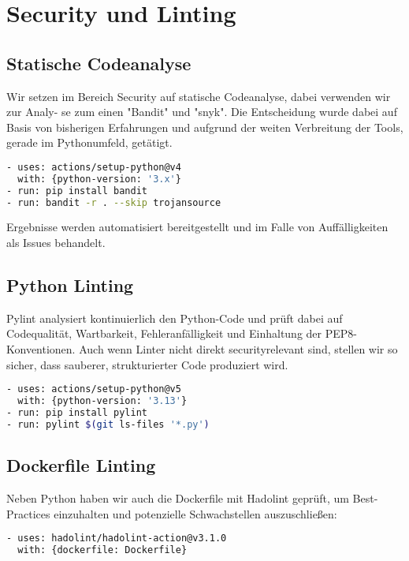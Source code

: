 \documentclass[12pt, a4paper]{scrreprt}
\begin{document}
\chapter{Security und Linting}

\section{Statische Codeanalyse}
Wir setzen im Bereich Security auf statische Codeanalyse, dabei verwenden wir zur Analy- se zum einen "Bandit" und "snyk". Die Entscheidung wurde dabei auf Basis von bisherigen Erfahrungen und aufgrund der weiten Verbreitung der Tools, gerade im Pythonumfeld, getätigt.

\begin{lstlisting}[language=Bash, caption=Bandit via GitHub Actions]
- uses: actions/setup-python@v4
  with: {python-version: '3.x'}
- run: pip install bandit
- run: bandit -r . --skip trojansource
\end{lstlisting}
\noindent
Ergebnisse werden automatisiert bereitgestellt und im Falle von Auffälligkeiten als Issues behandelt.

\section{Python Linting}
Pylint analysiert kontinuierlich den Python-Code und prüft dabei auf Codequalität, Wartbarkeit, Fehleranfälligkeit und Einhaltung der PEP8-Konventionen. Auch wenn Linter nicht direkt securityrelevant sind, stellen wir so sicher, dass sauberer, strukturierter Code produziert wird.

\begin{lstlisting}[language=Bash, caption=Pylint Integration]
- uses: actions/setup-python@v5
  with: {python-version: '3.13'}
- run: pip install pylint
- run: pylint $(git ls-files '*.py')
\end{lstlisting}

\section{Dockerfile Linting}
Neben Python haben wir auch die Dockerfile mit Hadolint geprüft, um Best-Practices einzuhalten und potenzielle Schwachstellen auszuschließen:

\begin{lstlisting}[language=Bash, caption=Hadolint Action für Dockerfile]
- uses: hadolint/hadolint-action@v3.1.0
  with: {dockerfile: Dockerfile}
\end{lstlisting}
\end{document}
